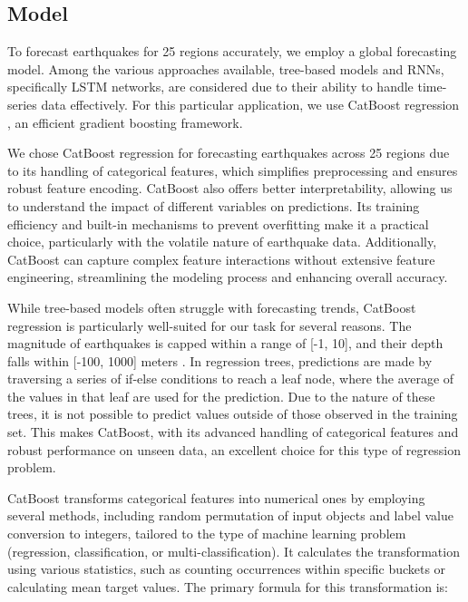 \subsection{Model}

To forecast earthquakes for 25 regions accurately, we employ a global forecasting model. Among the various approaches available, tree-based models and \ac{RNNs}, specifically \ac{LSTM} networks, are considered due to their ability to handle time-series data effectively. For this particular application, we use CatBoost regression \parencite{prokhorenkova2018catboost}, an efficient gradient boosting framework.

We chose CatBoost regression for forecasting earthquakes across 25 regions due to its handling of categorical features, which simplifies preprocessing and ensures robust feature encoding. CatBoost also offers better interpretability, allowing us to understand the impact of different variables on predictions. Its training efficiency and built-in mechanisms to prevent overfitting make it a practical choice, particularly with the volatile nature of earthquake data. Additionally, CatBoost can capture complex feature interactions without extensive feature engineering, streamlining the modeling process and enhancing overall accuracy.

While tree-based models often struggle with forecasting trends, CatBoost regression is particularly well-suited for our task for several reasons. The magnitude of earthquakes is capped within a range of [-1, 10], and their depth falls within [-100, 1000] meters \parencite{earthquake-data}. In regression trees, predictions are made by traversing a series of if-else conditions to reach a leaf node, where the average of the values in that leaf are used for the prediction. Due to the nature of these trees, it is not possible to predict values outside of those observed in the training set. This makes CatBoost, with its advanced handling of categorical features and robust performance on unseen data, an excellent choice for this type of regression problem.

CatBoost transforms categorical features into numerical ones by employing several methods, including random permutation of input objects and label value conversion to integers, tailored to the type of machine learning problem (regression, classification, or multi-classification). It calculates the transformation using various statistics, such as counting occurrences within specific buckets or calculating mean target values. The primary formula for this transformation is:

